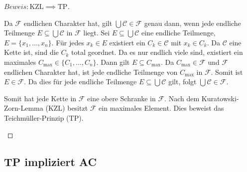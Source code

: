 \begin{proof}[$Beweis:\text{KZL} \implies \text{TP}$]
\begin{math-stroke}
Da $\mathcal{F}$ endlichen Charakter hat, gilt $\bigcup \mathcal{C} \in \mathcal{F}$ genau dann, wenn jede endliche Teilmenge $E \subseteq \bigcup \mathcal{C}$ in $\mathcal{F}$ liegt.
Sei $E \subseteq \bigcup \mathcal{C}$ eine endliche Teilmenge, $E = \{x_1, \dots, x_n\}$.
Für jedes $x_k \in E$ existiert ein $C_k \in \mathcal{C}$ mit $x_k \in C_k$.
Da $\mathcal{C}$ eine Kette ist, sind die $C_k$ total geordnet. Da es nur endlich viele sind, existiert ein maximales $C_{\text{max}} \in \{C_1, \dots, C_n\}$.
Dann gilt $E \subseteq C_{\text{max}}$.
Da $C_{\text{max}} \in \mathcal{F}$ und $\mathcal{F}$ endlichen Charakter hat, ist jede endliche Teilmenge von $C_{\text{max}}$ in $\mathcal{F}$.
Somit ist $E \in \mathcal{F}$.
Da dies für jede endliche Teilmenge $E \subseteq \bigcup \mathcal{C}$ gilt, folgt $\bigcup \mathcal{C} \in \mathcal{F}$.

Somit hat jede Kette in $\mathcal{F}$ eine obere Schranke in $\mathcal{F}$.
Nach dem Kuratowski-Zorn-Lemma ($\text{KZL}$) besitzt $\mathcal{F}$ ein maximales Element.
Dies beweist das Teichmüller-Prinzip ($\text{TP}$).
\end{math-stroke}
\end{proof}

\begin{ai-global-state-checkpoint-invisible-content}
\end{ai-global-state-checkpoint-invisible-content}

\subsection{TP impliziert AC}

